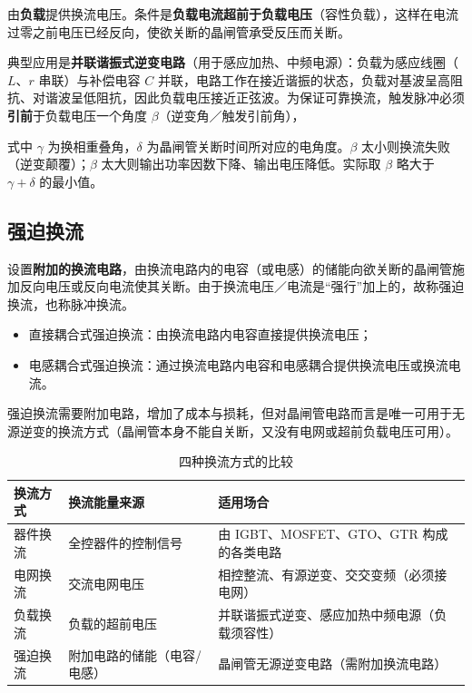 由\textbf{负载}提供换流电压。条件是\textbf{负载电流超前于负载电压}（容性负载），这样在电流过零之前电压已经反向，使欲关断的晶闸管承受反压而关断。

典型应用是\textbf{并联谐振式逆变电路}（用于感应加热、中频电源）：负载为感应线圈（$L$、$r$ 串联）与补偿电容 $C$ 并联，电路工作在接近谐振的状态，负载对基波呈高阻抗、对谐波呈低阻抗，因此负载电压接近正弦波。为保证可靠换流，触发脉冲必须\textbf{引前}于负载电压一个角度 $\beta$（逆变角／触发引前角），

\keyformula{\beta>\gamma+\delta}

式中 $\gamma$ 为换相重叠角，$\delta$ 为晶闸管关断时间所对应的电角度。$\beta$ 太小则换流失败（逆变颠覆）；$\beta$ 太大则输出功率因数下降、输出电压降低。实际取 $\beta$ 略大于 $\gamma+\delta$ 的最小值。

\subsection{强迫换流}

设置\textbf{附加的换流电路}，由换流电路内的电容（或电感）的储能向欲关断的晶闸管施加反向电压或反向电流使其关断。由于换流电压／电流是“强行”加上的，故称强迫换流，也称脉冲换流。

\begin{itemize}
  \item 直接耦合式强迫换流：由换流电路内电容直接提供换流电压；
  \item 电感耦合式强迫换流：通过换流电路内电容和电感耦合提供换流电压或换流电流。
\end{itemize}

强迫换流需要附加电路，增加了成本与损耗，但对晶闸管电路而言是唯一可用于无源逆变的换流方式（晶闸管本身不能自关断，又没有电网或超前负载电压可用）。

\begin{table}[htbp]
\centering
\caption{四种换流方式的比较}
\label{tab:4-1}
\begin{tabular}{p{2.4cm}p{4.4cm}p{7.6cm}}
\toprule
\textbf{换流方式} & \textbf{换流能量来源} & \textbf{适用场合} \\
\midrule
器件换流 & 全控器件的控制信号 & 由 IGBT、MOSFET、GTO、GTR 构成的各类电路 \\
电网换流 & 交流电网电压 & 相控整流、有源逆变、交交变频（必须接电网） \\
负载换流 & 负载的超前电压 & 并联谐振式逆变、感应加热中频电源（负载须容性） \\
强迫换流 & 附加电路的储能（电容/电感） & 晶闸管无源逆变电路（需附加换流电路） \\
\bottomrule
\end{tabular}
\end{table}

